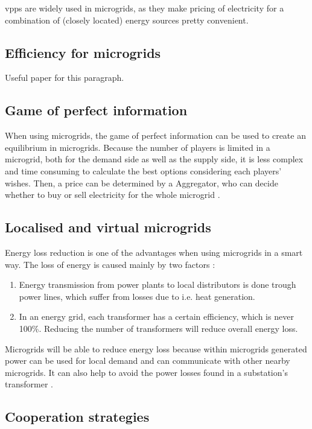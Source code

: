 \glspl{vpp} are widely used in microgrids, as they make pricing of electricity for a combination of (closely located) energy sources pretty convenient.  

\subsection{Efficiency for microgrids}

Useful paper for this paragraph\cite{MicrogridModellingPetrosAristidou,HatziargyriouAsanoIravaniMarnay2007}.

\subsection{Game of perfect information}
When using microgrids, the game of perfect information can be used to create an equilibrium in microgrids. Because the number of players is limited in a microgrid, both for the demand side as well as the supply side, it is less complex and time consuming to calculate the best options considering each players' wishes. Then, a price can be determined by a Aggregator, who can decide whether to buy or sell electricity for the whole microgrid  \cite{MicrogridModellingPetrosAristidou}.

\subsection{Localised and virtual microgrids}
Energy loss reduction is one of the advantages when using microgrids in a smart way. The loss of energy is caused mainly by two factors \cite{EnergyLossURL}: 

\begin{enumerate}
\item Energy transmission from power plants to local distributors is done trough power lines, which suffer from losses due to i.e. heat generation\cite{LasseterPaigi2004}.
\item In an energy grid, each transformer has a certain efficiency, which is never 100\%. Reducing the number of transformers will reduce overall energy loss.
\end{enumerate}

Microgrids will be able to reduce energy loss because within microgrids generated power can be used for local demand and can communicate with other nearby microgrids. It can also help to avoid the power losses found in a substation's transformer \cite{keypaper}.


\subsection{Cooperation strategies}


